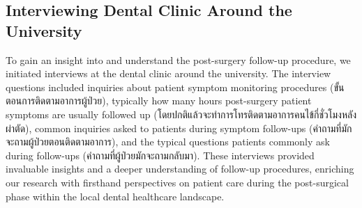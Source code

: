 \documentclass[12pt,oneside,openright,a4paper]{cpe-english-project}
\begin{document}
    \subsection{Interviewing Dental Clinic Around the University}
      \qquad To gain an insight into and understand the post-surgery follow-up procedure, we initiated interviews at the dental clinic around the university. The interview questions included inquiries about patient symptom monitoring procedures (\textthai{ขั้นตอนการติดตามอาการผู้ป่วย}), typically how many hours post-surgery patient symptoms are usually followed up (\textthai{โดยปกติแล้วจะทำการโทรติดตามอาการคนไข้กี่ชั่วโมงหลังผ่าตัด}), common inquiries asked to patients during symptom follow-ups (\textthai{คำถามที่มักจะถามผู้ป่วยตอนติดตามอาการ}), and the typical questions patients commonly ask during follow-ups (\textthai{คำถามที่ผู้ป่วยมักจะถามกลับมา}). These interviews provided invaluable insights and a deeper understanding of follow-up procedures, enriching our research with firsthand perspectives on patient care during the post-surgical phase within the local dental healthcare landscape. \par
\newpage
\end{document}

